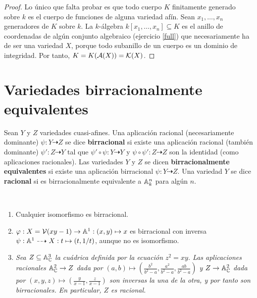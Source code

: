 \documentclass[ACGA.tex]{subfiles}
\begin{document}
\begin{proof}
 Lo único que falta probar es que todo cuerpo $K$ finitamente generado sobre $k$ es el cuerpo de funciones de alguna variedad afín. Sean $x_1,\ldots,x_n$ generadores de $K$ sobre $k$. La $k$-álgebra $k[x_1,\ldots,x_n]\subseteq K$ es el anillo de coordenadas de algún conjunto algebraico (ejercicio \ref{full}) que necesariamente ha de ser una variedad $X$, porque todo subanillo de un cuerpo es un dominio de integridad. Por tanto, $K=K(\mathcal{A}(X))={\mathcal K}(X)$.
\end{proof}



\section{Variedades birracionalmente equivalentes}


\begin{defi}
 Sean $Y$ y $Z$ variedades cuasi-afines. Una aplicación racional (necesariamente dominante) $\psi:Y\dashrightarrow Z$ se dice {\bf birracional} si existe una aplicación racional (también dominante) $\psi':Z\dashrightarrow Y$ tal que $\psi'\circ\psi:Y\dashrightarrow Y$ y $\psi\circ\psi':Z\dashrightarrow Z$ son la identidad (como aplicaciones racionales). Las variedades $Y$ y $Z$ se dicen {\bf birracionalmente equivalentes} si existe una aplicación birracional $\psi:Y\dashrightarrow Z$. Una variedad $Y$ se dice {\bf racional} si es birracionalmente equivalente a $\mathbb{A}^n_k$ para algún $n$.
\end{defi}

 \begin{ejs}\
 \begin{enumerate}
 \item Cualquier isomorfismo es birracional.
 \item $\varphi: X=\mathcal{V}(xy-1)\to\mathbb{A}^1:(x,y)\mapsto x$ es birracional con inversa $\psi:\mathbb{A}^1\dashrightarrow X: t\mapsto (t,1/t)$, aunque no es isomorfismo.
 
 \item \emph{
  Sea $Z\subseteq\mathbb{A}^3_{\mathbb{C}}$ la cuádrica definida por la ecuación $z^2=xy$. Las aplicaciones racionales $\mathbb{A}^2_{\mathbb{C}}\to Z$ dada por $(a,b)\mapsto(\frac{b^2}{b^2-a},\frac{a^2}{b^2-a},\frac{ab}{b^2-a})$ y $Z\to\mathbb{A}^2_{\mathbb{C}}$ dada por $(x,y,z)\mapsto (\frac{y}{x-1},\frac{z}{x-1})$ son inversas la una de la otra, y por tanto son birracionales. En particular, $Z$ es racional.}
  \end{enumerate}
 \end{ejs}
\end{document}
